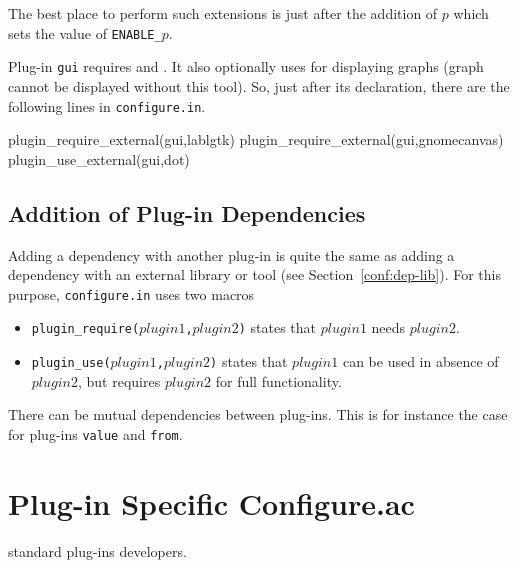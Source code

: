 \begin{convention}
  The best place to perform such extensions is just after the addition of $p$
  which sets the value of \texttt{ENABLE\_$p$}.
\end{convention}

\begin{example}
  Plug-in \texttt{gui} requires
  \lablgtk{} and \gnomecanvas{}. It
  also optionally uses \dottool{} for displaying graphs (graph cannot
  be displayed without this tool). So, just after its declaration, there are the
  following lines in \texttt{configure.in}.
\begin{configurecode}
plugin_require_external(gui,lablgtk)
plugin_require_external(gui,gnomecanvas)
plugin_use_external(gui,dot)
\end{configurecode}
\end{example}

\subsection{Addition of Plug-in Dependencies}\label{conf:dep-plug}

Adding a dependency with another plug-in is quite the same as adding a
dependency with an external library or tool (see
Section~\ref{conf:dep-lib}). For this purpose, \texttt{configure.in}
uses two macros
\begin{itemize}
\item \texttt{plugin\_require($plugin1$,$plugin2$)}%
 states that
$plugin1$ needs $plugin2$.
\item \texttt{plugin\_use($plugin1$,$plugin2$)}%
 states that
$plugin1$ can be used in absence of $plugin2$, but requires $plugin2$
for full functionality.
\end{itemize}

There can be mutual dependencies between plug-ins. This is for instance
the case for plug-ins \texttt{value} and \texttt{from}.

\section{Plug-in Specific Configure.ac}
\label{sec:config-external}

\begin{target}standard plug-ins developers.\end{target}

